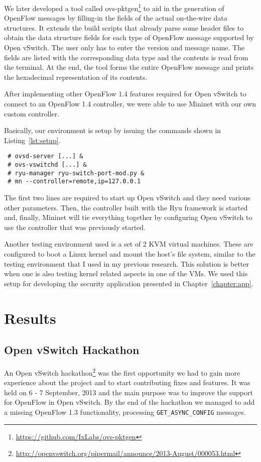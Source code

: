We later developed a tool called ovs-pktgen\footnote{\url{https://github.com/IxLabs/ovs-pktgen}}
to aid in the generation of OpenFlow messages by filling-in the fields of the actual on-the-wire
data structures. It extends the build scripts that already parse some header files to obtain the
data structure fields for each type of OpenFlow message supported by Open vSwitch. The user only
has to enter the version and message name. The fields are listed with the corresponding data type
and the contents is read from the terminal. At the end, the tool forms the entire OpenFlow message
and prints the hexadecimal representation of its contents.

After implementing other OpenFlow 1.4 features required for Open vSwitch to connect
to an OpenFlow 1.4 controller, we were able to use Mininet with our own custom controller.

Basically, our environment is setup by issuing the commands shown in Listing~\ref{lst:setup}.
\lstset{caption=Setting up the Development Environment,label=lst:setup}
\begin{lstlisting}
 # ovsd-server [...] &
 # ovs-vswitchd [...] &
 # ryu-manager ryu-switch-port-mod.py &
 # mn --controller=remote,ip=127.0.0.1
\end{lstlisting}
The first two lines are required to start up Open vSwitch and they need various other parameters.
Then, the controller built with the Ryu framework is started and, finally, Mininet will tie
everything together by configuring Open vSwitch to use the controller that was previously started.

Another testing environment used is a set of 2 KVM virtual machines. These are configured to
boot a Linux kernel and mount the host's file system, similar to the testing environment that
I used in my previous research. This solution is better when one is also testing kernel related
aspects in one of the VMs. We used this setup for developing the security application presented
in Chapter~\ref{chapter:app}.

\section{Results}

\subsection{Open vSwitch Hackathon}

An Open vSwitch hackathon\footnote{\url{http://openvswitch.org/pipermail/announce/2013-August/000053.html}}
was the first opportunity we had to gain more experience about the project
and to start contributing fixes and features. It was held on 6 - 7 September, 2013 and the main
purpose was to improve the support for OpenFlow in Open vSwitch. By the end of the hackathon we managed
to add a missing OpenFlow 1.3 functionality, processing \texttt{GET_ASYNC_CONFIG} messages.

